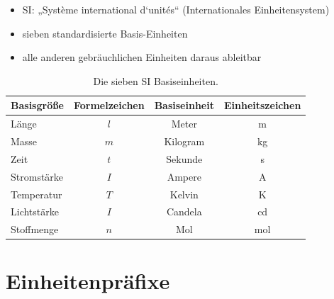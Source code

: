 \begin{frame}
    \frametitle{\insertsection}
    \begin{itemize}
        \item SI: „Système international d`unités“ (Internationales Einheitensystem)
        \item sieben standardisierte Basis-Einheiten
        \item alle anderen gebräuchlichen Einheiten daraus ableitbar    
    \end{itemize}
    \vfill
    \begin{table}
        \centering
        \begin{tabular}{lccc}
            Basisgröße & Formelzeichen & Basiseinheit & Einheitszeichen\\
            \hline
            Länge & $l$ & Meter & \si{\meter}\\
            Masse & $m$ & Kilogram & \si{\kilo\gram}\\
            Zeit & $t$ & Sekunde & \si{\second}\\
            Stromstärke & $I$ & Ampere & \si{\ampere}\\
            Temperatur & $T$ & Kelvin & \si{\kelvin}\\
            Lichtstärke & $I$ & Candela & \si{\candela}\\
            Stoffmenge & $n$ & Mol & \si{\mol}
        \end{tabular}
        \caption{Die sieben SI Basiseinheiten.}
    \end{table}
\end{frame}

\section{Einheitenpräfixe}

